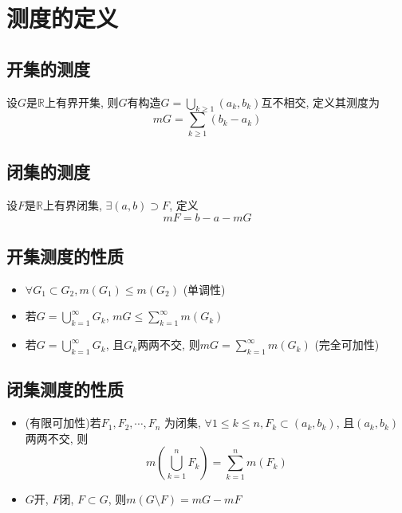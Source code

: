 \section{测度的定义}
\subsection{开集的测度}
设$G$是$\mathbb{R}$上有界开集, 则$G$有构造$G = \bigcup _{k \ge 1} \left( a_k, b_k \right)$互不相交, 定义其测度为
\begin{equation*}
    mG = \sum_{k \ge 1} (b_k - a_k)
\end{equation*}
\subsection{闭集的测度}
设$F$是$\mathbb{R}$上有界闭集, $\exists \left( a, b \right) \supset F$, 定义
\begin{equation*}
    mF = b-a-mG
\end{equation*}
\subsection{开集测度的性质}
\begin{itemize}
    \item $\forall G_1 \subset G_2, m(G_1) \le m(G_2)$ (单调性)
    \item 若$G = \bigcup^{\infty}_{k=1} G_k$, $mG \le \sum^{\infty}_{k=1} m(G_k)$
    \item 若$G = \bigcup^{\infty}_{k=1} G_k$, 且$G_k$两两不交, 则$mG = \sum^{\infty}_{k=1} m(G_k)$ (完全可加性)
\end{itemize}
\subsection{闭集测度的性质}
\begin{itemize}
    \item (有限可加性)若$F_1, F_2, \cdots, F_n$ 为闭集, $\forall 1 \le k \le n, F_k \subset \left( a_k, b_k \right)$, 且$\left( a_k, b_k \right)$两两不交, 则
        \begin{equation*}
            m(\bigcup^{n}_{k=1} F_k) = \sum^{n}_{k=1} m(F_k)
        \end{equation*}
    \item $G$开, $F$闭, $F \subset G$, 则$m(G \setminus F) = mG - mF$
\end{itemize}
